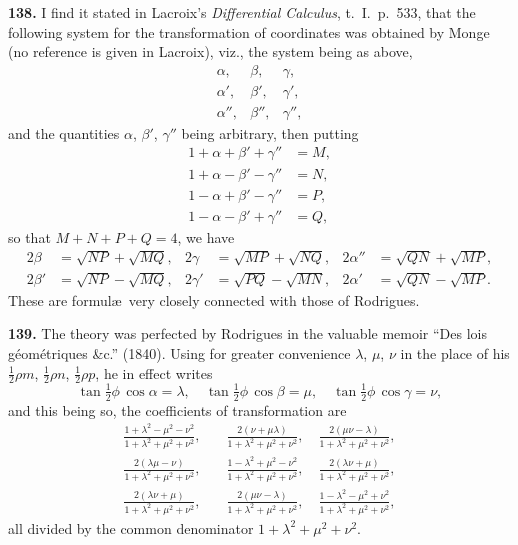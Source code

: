 \documentclass[11pt,a4paper]{article}
\theoremstyle{definition}
\begin{document}
\textbf{138.} I find it stated in Lacroix's \textit{Differential Calculus}, t.~I.~p.~533, that the following system for the transformation of coordinates was obtained by Monge (no reference is given in Lacroix), viz., the system being as above,
\[
\begin{array}{ccc}
\alpha, & \beta, & \gamma, \\
\alpha', & \beta', & \gamma', \\
\alpha'', & \beta'', & \gamma'',
\end{array}
\]
and the quantities $\alpha$, $\beta'$, $\gamma''$ being arbitrary, then putting
\begin{align*}
1 + \alpha + \beta' + \gamma'' &= M, \\
1 + \alpha - \beta' - \gamma'' &= N, \\
1 - \alpha + \beta' - \gamma'' &= P, \\
1 - \alpha - \beta' + \gamma'' &= Q,
\end{align*}
so that $M + N + P + Q = 4$, we have
\begin{align*}
2\beta &= \sqrt{NP} + \sqrt{MQ}, & 2\gamma &= \sqrt{MP} + \sqrt{NQ}, & 2\alpha'' &= \sqrt{QN} + \sqrt{MP}, \\
2\beta' &= \sqrt{NP} - \sqrt{MQ}, & 2\gamma' &= \sqrt{PQ} - \sqrt{MN}, & 2\alpha' &= \sqrt{QN} - \sqrt{MP}.
\end{align*}
These are formul\ae\ very closely connected with those of Rodrigues.

\textbf{139.} The theory was perfected by Rodrigues in the valuable memoir ``Des lois g\'eom\'etriques \&c.'' (1840). Using for greater convenience $\lambda$, $\mu$, $\nu$ in the place of his $\frac{1}{2}\rho m$, $\frac{1}{2}\rho n$, $\frac{1}{2}\rho p$, he in effect writes
\[
\tan\tfrac{1}{2}\phi\,\cos\alpha = \lambda, \quad \tan\tfrac{1}{2}\phi\,\cos\beta = \mu, \quad \tan\tfrac{1}{2}\phi\,\cos\gamma = \nu,
\]
and this being so, the coefficients of transformation are
\begin{align*}
\frac{1 + \lambda^2 - \mu^2 - \nu^2}{1 + \lambda^2 + \mu^2 + \nu^2}, &\quad \frac{2(\nu + \mu\lambda)}{1 + \lambda^2 + \mu^2 + \nu^2}, \quad \frac{2(\mu\nu - \lambda)}{1 + \lambda^2 + \mu^2 + \nu^2}, \\
\frac{2(\lambda\mu - \nu)}{1 + \lambda^2 + \mu^2 + \nu^2}, &\quad \frac{1 - \lambda^2 + \mu^2 - \nu^2}{1 + \lambda^2 + \mu^2 + \nu^2}, \quad \frac{2(\lambda\nu + \mu)}{1 + \lambda^2 + \mu^2 + \nu^2}, \\
\frac{2(\lambda\nu + \mu)}{1 + \lambda^2 + \mu^2 + \nu^2}, &\quad \frac{2(\mu\nu - \lambda)}{1 + \lambda^2 + \mu^2 + \nu^2}, \quad \frac{1 - \lambda^2 - \mu^2 + \nu^2}{1 + \lambda^2 + \mu^2 + \nu^2},
\end{align*}
all divided by the common denominator $1 + \lambda^2 + \mu^2 + \nu^2$.
\end{document}
